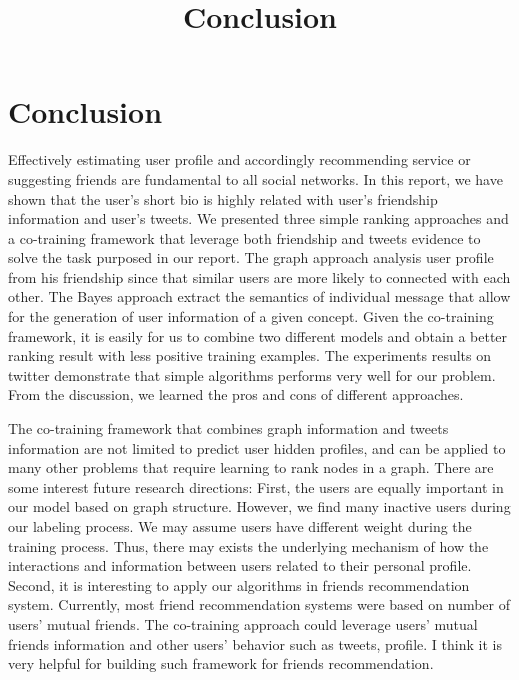 \documentclass{article}
\begin{document}
\title{Conclusion}
\maketitle \else \fi

\section{Conclusion}\label{sec:conclusion}
Effectively estimating user profile and accordingly recommending service or suggesting friends are fundamental to all social networks. In this report, we have shown that the user's short bio is highly related with user's friendship information and user's tweets. We presented three simple ranking approaches and a co-training framework that leverage both friendship and tweets evidence to solve the task purposed in our report. The graph approach analysis user profile from his friendship since that similar users are more likely to connected with each other. The Bayes approach extract the semantics of individual message that allow for the generation of user information of a given concept. Given the co-training framework, it is easily for us to combine two different models and obtain a better ranking result with less positive training examples. The experiments results on twitter demonstrate that simple algorithms performs very well for our problem. From the discussion, we learned the pros and cons of different approaches.

The co-training framework that combines graph information and tweets information are not limited to predict user hidden profiles, and can be applied to many other problems that require learning to rank nodes in a graph. There are some interest future research directions: First, the users are equally important in our model based on graph structure. However, we find many inactive users during our labeling process. We may assume users have different weight during the training process. Thus, there may exists the underlying mechanism of how the interactions and information between users related to their personal profile. Second, it is interesting to apply our algorithms in friends recommendation system. Currently, most friend recommendation systems were based on number of users' mutual friends. The co-training approach could leverage users' mutual friends information and other users' behavior such as tweets, profile. I think it is very helpful for building such framework for friends recommendation.

\ifx \allfiles \undefined
\end{document}
